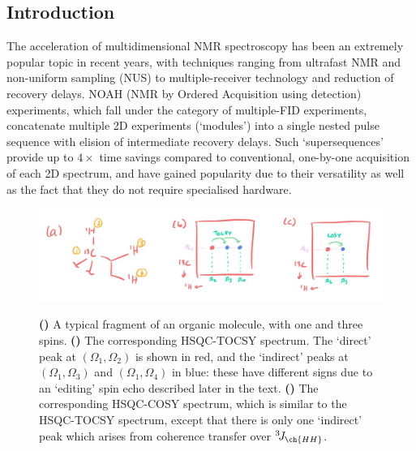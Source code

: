 \documentclass[a4paper,12pt]{article}
\newcommand{\proton}{\ch{^{1}H}}
\newcommand{\carbon}{\ch{^{13}C}}
\begin{document}
\begin{refsection}
\clearpage

\section{Introduction}

The acceleration of multidimensional NMR spectroscopy has been an extremely popular topic in recent years, with techniques ranging from ultrafast NMR\autocite{Frydman2002PNASUSA,Pelupessy2003JACS,Frydman2003JACS} and non-uniform sampling (NUS)\autocite{Kazimierczuk2010PNMRS,Mobli2014PNMRS,Kazimierczuk2015MRC} to multiple-receiver technology\autocite{Kupce2006JACS,Kupce2008JACS,Kovacs2016MRC} and reduction of recovery delays\autocite{Kupce2007MRC,SchulzeSunninghausen2014JACS,Becker2019JMR}.
NOAH (NMR by Ordered Acquisition using \proton{} detection) experiments\autocite{Kupce2017ACIE}, which fall under the category of multiple-FID experiments\autocite{Yong2023RSCBook}, concatenate multiple 2D experiments (`modules') into a single nested pulse sequence with elision of intermediate recovery delays.
Such `supersequences' provide up to $4\times$ time savings compared to conventional, one-by-one acquisition of each 2D spectrum, and have gained popularity due to their versatility as well as the fact that they do not require specialised hardware.

\begin{figure}[!ht]
    \centering
    \includegraphics[width=\textwidth]{intro.jpg}%
    {\label{fig:intro_molecular_structure}}%
    {\label{fig:intro_hsqc_tocsy}}%
    {\label{fig:intro_hsqc_cosy}}%
    \caption[Mockup illustrating salient features of HSQC-TOCSY and -COSY spectra]{
        \textbf{()} A typical fragment of an organic molecule, with one \carbon{} and three \proton{} spins.
        \textbf{()} The corresponding HSQC-TOCSY spectrum. The `direct' peak at $(\Omega_1, \Omega_2)$ is shown in red, and the `indirect' peaks at $(\Omega_1, \Omega_3)$ and $(\Omega_1, \Omega_4)$ in blue: these have different signs due to an `editing' spin echo described later in the text.
        \textbf{()} The corresponding HSQC-COSY spectrum, which is similar to the HSQC-TOCSY spectrum, except that there is only one `indirect' peak which arises from coherence transfer over ${}^3\!J_{\ch{HH}}$.
    }
    \label{fig:intro}
\end{figure}


\end{refsection}
\end{document}
